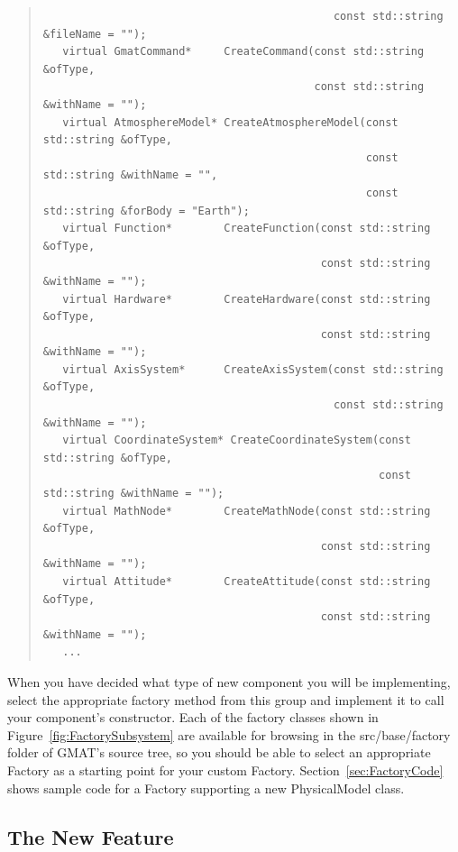 \documentclass[letterpaper,10pt]{article}
\begin{document}
\begin{quote}
\begin{small}
\begin{verbatim}
                                             const std::string &fileName = "");
   virtual GmatCommand*     CreateCommand(const std::string &ofType,
                                          const std::string &withName = "");
   virtual AtmosphereModel* CreateAtmosphereModel(const std::string &ofType,
                                                  const std::string &withName = "",
                                                  const std::string &forBody = "Earth");
   virtual Function*        CreateFunction(const std::string &ofType,
                                           const std::string &withName = "");
   virtual Hardware*        CreateHardware(const std::string &ofType,
                                           const std::string &withName = "");
   virtual AxisSystem*      CreateAxisSystem(const std::string &ofType,
                                             const std::string &withName = "");
   virtual CoordinateSystem* CreateCoordinateSystem(const std::string &ofType,
                                                    const std::string &withName = "");
   virtual MathNode*        CreateMathNode(const std::string &ofType,
                                           const std::string &withName = "");
   virtual Attitude*        CreateAttitude(const std::string &ofType,
                                           const std::string &withName = "");
   ...
\end{verbatim}
\end{small}
\end{quote}

\noindent When you have decided what type of new component you will be implementing, select the
appropriate factory method from this group and implement it to call your component's constructor.
Each of the factory classes shown in Figure~\ref{fig:FactorySubsystem} are available for browsing
in the src/base/factory folder of GMAT's source tree, so you should be able to select an
appropriate Factory as a starting point for your custom Factory.  Section~\ref{sec:FactoryCode}
shows sample code for a Factory supporting a new PhysicalModel class.

\subsection{The New Feature}
\end{document}
